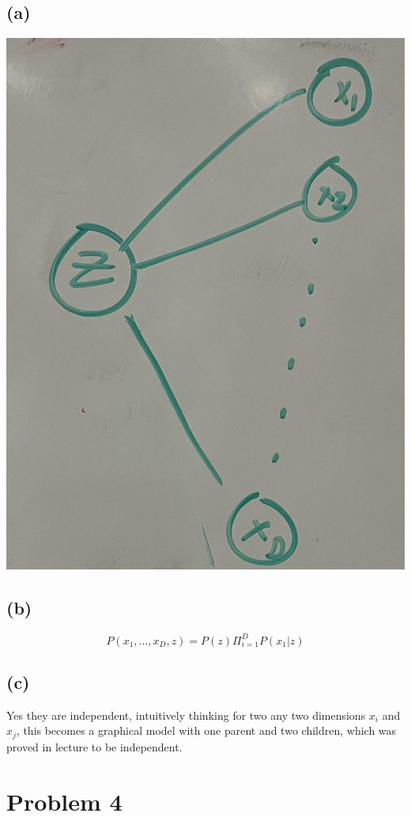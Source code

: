 \documentclass[12pt]{article}
\begin{document}
\subsection*{(a)}
\includegraphics[scale=0.2]{fig1.jpg}
\subsection*{(b)}
$$P(x_1,...,x_D,z)=\boxed{P(z)\Pi_{i=1}^{D}P(x_1|z)}$$
\subsection*{(c)}
Yes they are independent, intuitively thinking for two any two dimensions $x_i$ and $x_j$, this becomes a graphical model with one parent and two children, which was proved in lecture to 
be independent.

 \section*{Problem 4}
\end{document}
